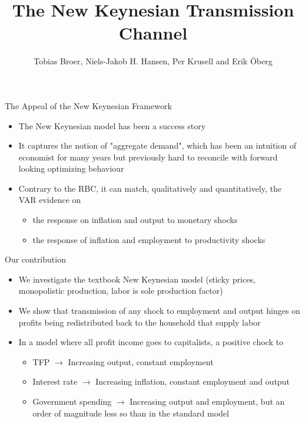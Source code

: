 \documentclass{beamer}
\title[]{The New Keynesian Transmission Channel}
\author{Tobias Broer, Niels-Jakob H. Hansen, Per Krusell and Erik {\"O}berg}
\newcommand{\bit}{\begin{itemize}}
\newcommand{\eit}{\end{itemize}}
\begin{document}
\begin{frame}
\maketitle
\end{frame}



\begin{frame}{The Appeal of the New Keynesian Framework}

\begin{itemize}
\item The New Keynesian model has been a success story

\item It captures the notion of "aggregate demand", which has been an intuition of economist for many years but previously hard to reconcile with forward looking optimizing behaviour

\item Contrary to the RBC, it can match, qualitatively and quantitatively, the VAR evidence on   
\begin{itemize}
\item the response on inflation and output to monetary shocks
\item the response of inflation and employment to productivity shocks
\end{itemize}
\end{itemize}

\end{frame}


\begin{frame}{Our contribution}

\begin{itemize}
\item We investigate the textbook New Keynesian model (sticky prices, monopolistic production, labor is sole production factor)
\item We show that transmission of any shock to employment and output hinges on profits being redistributed back to the household that supply labor
\item In a model where all profit income goes to capitalists, a positive chock to
\bit
\item TFP $\rightarrow$ Increasing output, constant employment
\item Interest rate $\rightarrow$ Increasing inflation, constant employment and output
\item Government spending $\rightarrow$ Increasing output and employment, but an order of magnitude less so than in the standard model
\eit
\end{itemize}

\end{frame}


\end{document}
